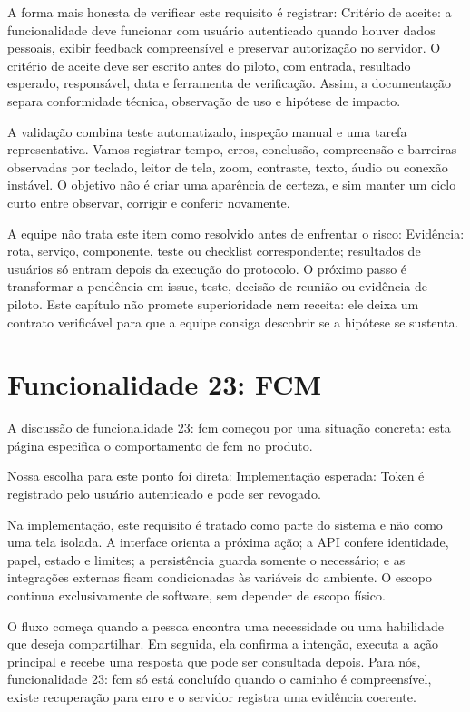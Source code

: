 \documentclass[12pt,oneside,a4paper,article]{abntex2}
\begin{document}
A forma mais honesta de verificar este requisito é registrar: Critério de aceite: a funcionalidade deve funcionar com usuário autenticado quando houver dados pessoais, exibir feedback compreensível e preservar autorização no servidor. O critério de aceite deve ser escrito antes do piloto, com entrada, resultado esperado, responsável, data e ferramenta de verificação. Assim, a documentação separa conformidade técnica, observação de uso e hipótese de impacto.

A validação combina teste automatizado, inspeção manual e uma tarefa representativa. Vamos registrar tempo, erros, conclusão, compreensão e barreiras observadas por teclado, leitor de tela, zoom, contraste, texto, áudio ou conexão instável. O objetivo não é criar uma aparência de certeza, e sim manter um ciclo curto entre observar, corrigir e conferir novamente.

A equipe não trata este item como resolvido antes de enfrentar o risco: Evidência: rota, serviço, componente, teste ou checklist correspondente; resultados de usuários só entram depois da execução do protocolo. O próximo passo é transformar a pendência em issue, teste, decisão de reunião ou evidência de piloto. Este capítulo não promete superioridade nem receita: ele deixa um contrato verificável para que a equipe consiga descobrir se a hipótese se sustenta.

\section{Funcionalidade 23: FCM}
A discussão de funcionalidade 23: fcm começou por uma situação concreta: esta página especifica o comportamento de fcm no produto.

Nossa escolha para este ponto foi direta: Implementação esperada: Token é registrado pelo usuário autenticado e pode ser revogado.

Na implementação, este requisito é tratado como parte do sistema e não como uma tela isolada. A interface orienta a próxima ação; a API confere identidade, papel, estado e limites; a persistência guarda somente o necessário; e as integrações externas ficam condicionadas às variáveis do ambiente. O escopo continua exclusivamente de software, sem depender de escopo físico.

O fluxo começa quando a pessoa encontra uma necessidade ou uma habilidade que deseja compartilhar. Em seguida, ela confirma a intenção, executa a ação principal e recebe uma resposta que pode ser consultada depois. Para nós, funcionalidade 23: fcm só está concluído quando o caminho é compreensível, existe recuperação para erro e o servidor registra uma evidência coerente.
\end{document}
